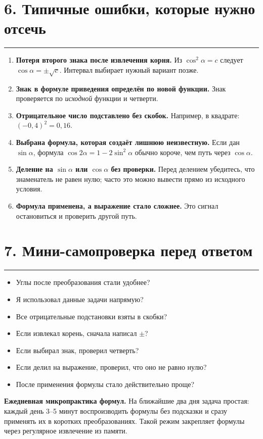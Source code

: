 \documentclass[a4paper,12pt]{article}
\newcommand{\sectionline}{\vspace{-1mm}\noindent\color{accent}\rule{\linewidth}{0.7pt}\color{textgray}\vspace{2mm}}
\newcommand{\key}[1]{\textbf{\color{darkaccent}#1}}
\begin{document}
\section*{6. Типичные ошибки, которые нужно отсечь}
\sectionline

\begin{enumerate}
  \item \key{Потеря второго знака после извлечения корня.} Из $\cos^2\alpha=c$ следует $\cos\alpha=\pm\sqrt c$. Интервал выбирает нужный вариант позже.
  \item \key{Знак в формуле приведения определён по новой функции.} Знак проверяется по \emph{исходной} функции и четверти.
  \item \key{Отрицательное число подставлено без скобок.} Например, в квадрате: $(-0{,}4)^2=0{,}16$.
  \item \key{Выбрана формула, которая создаёт лишнюю неизвестную.} Если дан $\sin\alpha$, формула $\cos2\alpha=1-2\sin^2\alpha$ обычно короче, чем путь через $\cos\alpha$.
  \item \key{Деление на $\sin\alpha$ или $\cos\alpha$ без проверки.} Перед делением убедитесь, что знаменатель не равен нулю; часто это можно вывести прямо из исходного условия.
  \item \key{Формула применена, а выражение стало сложнее.} Это сигнал остановиться и проверить другой путь.
\end{enumerate}

\section*{7. Мини-самопроверка перед ответом}
\sectionline

\begin{itemize}
  \item Углы после преобразования стали удобнее?
  \item Я использовал данные задачи напрямую?
  \item Все отрицательные подстановки взяты в скобки?
  \item Если извлекал корень, сначала написал $\pm$?
  \item Если выбирал знак, проверил четверть?
  \item Если делил на выражение, проверил, что оно не равно нулю?
  \item После применения формулы стало действительно проще?
\end{itemize}

\vspace{4mm}
\key{Ежедневная микропрактика формул.} На ближайшие два дня задача простая: каждый день 3--5 минут воспроизводить формулы без подсказки и сразу применять их в коротких преобразованиях. Такой режим закрепляет формулы через регулярное извлечение из памяти.
\end{document}
